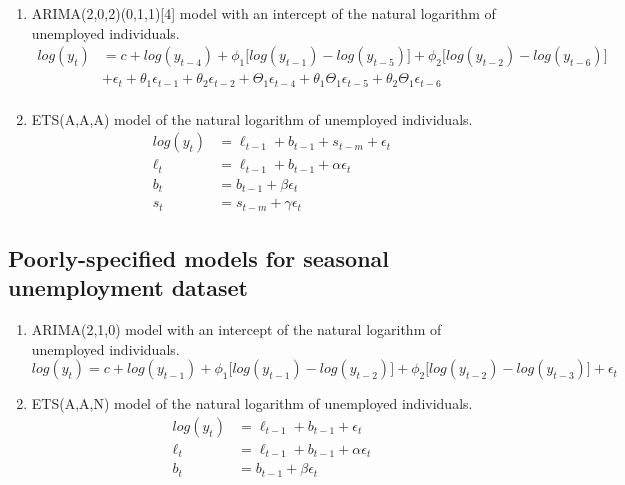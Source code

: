 \documentclass{monashthesis}
\begin{document}
\begin{enumerate}
\def\labelenumi{\arabic{enumi}.}
\item
  ARIMA(2,0,2)(0,1,1){[}4{]} model with an intercept of the natural logarithm of unemployed individuals.
  \begin{align*}
  log(y_t) &= c + log(y_{t-4}) + \phi_1\big[log(y_{t-1})-log(y_{t-5})\big] + \phi_2\big[log(y_{t-2})-log(y_{t-6})\big] \\
        &+ \epsilon_t + \theta_1\epsilon_{t-1} + \theta_2\epsilon_{t-2} + \Theta_1\epsilon_{t-4} + \theta_1\Theta_1\epsilon_{t-5} + \theta_2\Theta_1\epsilon_{t-6} \\
  \end{align*}
\item
  ETS(A,A,A) model of the natural logarithm of unemployed individuals.
  \begin{align*}
  log(y_t) &= \ell_{t-1} + b_{t-1} + s_{t-m} + \epsilon_t \\
  \ell_t &= \ell_{t-1} + b_{t-1} + \alpha \epsilon_t \\
  b_t &= b_{t-1} + \beta \epsilon_t \\
  s_{t} &= s_{t-m} + \gamma \epsilon_t
  \end{align*}
\end{enumerate}

\hypertarget{poorly-specified-models-for-seasonal-unemployment-dataset}{%
\subsection{Poorly-specified models for seasonal unemployment dataset}\label{poorly-specified-models-for-seasonal-unemployment-dataset}}

\begin{enumerate}
\def\labelenumi{\arabic{enumi}.}
\item
  ARIMA(2,1,0) model with an intercept of the natural logarithm of unemployed individuals.
  \begin{equation*}
  log(y_t) = c + log(y_{t-1}) + \phi_1\big[log(y_{t-1})-log(y_{t-2})\big] + \phi_2\big[log(y_{t-2})-log(y_{t-3})\big] + \epsilon_t
  \end{equation*}
\item
  ETS(A,A,N) model of the natural logarithm of unemployed individuals.
  \begin{align*}
  log(y_t) &= \ell_{t-1} + b_{t-1} + \epsilon_t \\
  \ell_t &= \ell_{t-1} + b_{t-1} + \alpha \epsilon_t \\
  b_t &= b_{t-1} + \beta \epsilon_t
  \end{align*}
\end{enumerate}
\end{document}
